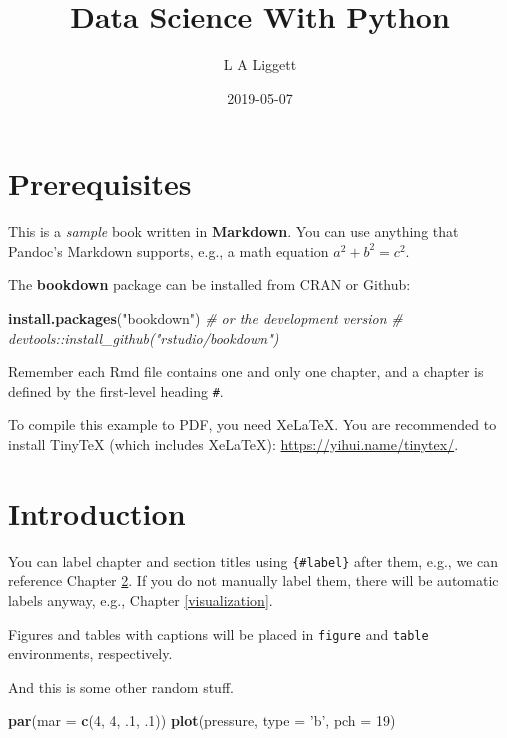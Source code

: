 \documentclass[]{book}
\title{Data Science With Python}
\author{L A Liggett}
\date{2019-05-07}
\newenvironment{Shaded}{\begin{snugshade}}{\end{snugshade}}
\newcommand{\KeywordTok}[1]{\textcolor[rgb]{0.13,0.29,0.53}{\textbf{#1}}}
\newcommand{\DataTypeTok}[1]{\textcolor[rgb]{0.13,0.29,0.53}{#1}}
\newcommand{\DecValTok}[1]{\textcolor[rgb]{0.00,0.00,0.81}{#1}}
\newcommand{\StringTok}[1]{\textcolor[rgb]{0.31,0.60,0.02}{#1}}
\newcommand{\CommentTok}[1]{\textcolor[rgb]{0.56,0.35,0.01}{\textit{#1}}}
\newcommand{\NormalTok}[1]{#1}
\begin{document}
\maketitle

{
\setcounter{tocdepth}{1}
\tableofcontents
}
\chapter{Prerequisites}\label{prerequisites}

This is a \emph{sample} book written in \textbf{Markdown}. You can use
anything that Pandoc's Markdown supports, e.g., a math equation
\(a^2 + b^2 = c^2\).

The \textbf{bookdown} package can be installed from CRAN or Github:

\begin{Shaded}
\begin{Highlighting}[]
\KeywordTok{install.packages}\NormalTok{(}\StringTok{"bookdown"}\NormalTok{)}
\CommentTok{# or the development version}
\CommentTok{# devtools::install_github("rstudio/bookdown")}
\end{Highlighting}
\end{Shaded}

Remember each Rmd file contains one and only one chapter, and a chapter
is defined by the first-level heading \texttt{\#}.

To compile this example to PDF, you need XeLaTeX. You are recommended to
install TinyTeX (which includes XeLaTeX):
\url{https://yihui.name/tinytex/}.

\chapter{Introduction}\label{intro}

You can label chapter and section titles using \texttt{\{\#label\}}
after them, e.g., we can reference Chapter \ref{intro}. If you do not
manually label them, there will be automatic labels anyway, e.g.,
Chapter \ref{visualization}.

Figures and tables with captions will be placed in \texttt{figure} and
\texttt{table} environments, respectively.

And this is some other random stuff.

\begin{Shaded}
\begin{Highlighting}[]
\KeywordTok{par}\NormalTok{(}\DataTypeTok{mar =} \KeywordTok{c}\NormalTok{(}\DecValTok{4}\NormalTok{, }\DecValTok{4}\NormalTok{, .}\DecValTok{1}\NormalTok{, .}\DecValTok{1}\NormalTok{))}
\KeywordTok{plot}\NormalTok{(pressure, }\DataTypeTok{type =} \StringTok{'b'}\NormalTok{, }\DataTypeTok{pch =} \DecValTok{19}\NormalTok{)}
\end{Highlighting}
\end{Shaded}
\end{document}
